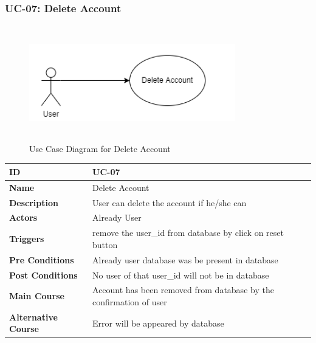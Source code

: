     \subsubsection{UC-07: Delete Account}
    \begin{figure}[H]
        \includegraphics[height=5cm, width=0.8\textwidth]{./diagrams/Use Case/u7.png}
        \centering 
        \caption{Use Case Diagram for Delete Account}
        \label{fig:Usecase1}
        \end{figure}
        
    \begin{center}
        \begin{tabularx}{\textwidth}{|l|X|}
            \hline
            \textbf{ID} & UC-07 \\
            \hline
            \textbf{Name} & Delete Account \\
            \hline
            \textbf{Description} & User can delete the account if he/she can \\
            \hline
            \textbf{Actors} & Already User \\
            \hline
            \textbf{Triggers} & remove the user\_id from database by click on reset button \\
            \hline
            \textbf{Pre Conditions} & Already user database was be present in database \\
            \hline
            \textbf{Post Conditions} & No user of that user\_id will not be in database \\
            \hline
            \textbf{Main Course} & Account has been removed from database by the confirmation of user \\
            \hline
            \textbf{Alternative Course} & Error will be appeared by database \\
            \hline
            
        \end{tabularx}
    \end{center}
    \newpage
    

